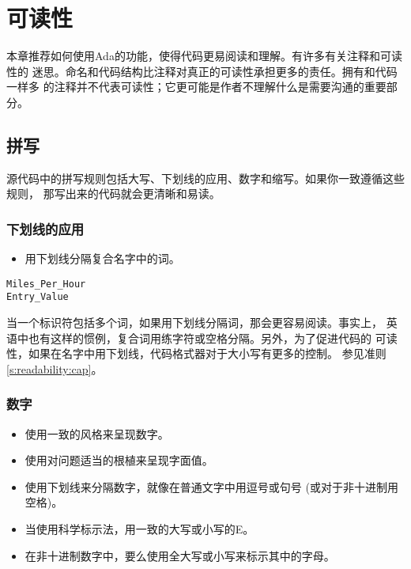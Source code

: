 %
%
%

\chapter{可读性}
\label{c:readability}

本章推荐如何使用Ada的功能，使得代码更易阅读和理解。有许多有关注释和可读性的
迷思。命名和代码结构比注释对真正的可读性承担更多的责任。拥有和代码一样多
的注释并不代表可读性；它更可能是作者不理解什么是需要沟通的重要部分。

\section{拼写}
源代码中的拼写规则包括大写、下划线的应用、数字和缩写。如果你一致遵循这些规则，
那写出来的代码就会更清晰和易读。

\subsection{下划线的应用}
\begin{itemize}
    \item 用下划线分隔复合名字中的词。
\end{itemize}

\begin{blockindent}
\noindent
\begin{lstlisting}
Miles_Per_Hour
Entry_Value
\end{lstlisting}
\end{blockindent}

\begin{blockindent}
当一个标识符包括多个词，如果用下划线分隔词，那会更容易阅读。事实上，
英语中也有这样的惯例，复合词用练字符或空格分隔。另外，为了促进代码的
可读性，如果在名字中用下划线，代码格式器对于大小写有更多的控制。
参见准则\ref{s:readability:cap}。
\end{blockindent}

\subsection{数字}
\begin{itemize}
    \item 使用一致的风格来呈现数字。
    \item 使用对问题适当的根植来呈现字面值。
    \item 使用下划线来分隔数字，就像在普通文字中用逗号或句号
(或对于非十进制用空格)。
    \item 当使用科学标示法，用一致的大写或小写的E。
    \item 在非十进制数字中，要么使用全大写或小写来标示其中的字母。
\end{itemize}

